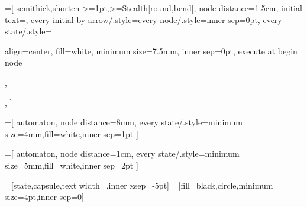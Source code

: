 \usetikzlibrary{automata}
\usetikzlibrary{arrows.meta}
\usetikzlibrary{bending}
\usetikzlibrary{shapes.callouts}
\usetikzlibrary{quotes}
\usetikzlibrary{positioning}
\usetikzlibrary{calc}
\usetikzlibrary{matrix}



\def\accsize{6pt}


=[
  semithick,shorten >=1pt,>={Stealth[round,bend]},
  node distance=1.5cm,
  initial text=,
  every initial by arrow/.style={every node/.style={inner sep=0pt}},
  every state/.style={
    align=center,
    fill=white,
    minimum size=7.5mm,
    inner sep=0pt,
    execute at begin node=\strut,
  },%
]

=[
  automaton,
  node distance=8mm,
  every state/.style={minimum size=4mm,fill=white,inner sep=1pt}
]

=[
  automaton,
  node distance=1cm,
  every state/.style={minimum size=5mm,fill=white,inner sep=2pt}
]

=[state,capsule,text width=,inner xsep=-5pt]
=[fill=black,circle,minimum size=4pt,inner sep=0]

\makeatletter
{}
\makeatother

